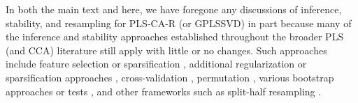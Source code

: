 \documentclass[12pt]{article}
\begin{document}
In both the main text and here, we have foregone any discussions of
inference, stability, and resampling for PLS-CA-R (or GPLSSVD) in part
because many of the inference and stability approaches established
throughout the broader PLS (and CCA) literature still apply with little
or no changes. Such approaches include feature selection or
sparsification \citep{sutton_sparse_2018}, additional regularization or
sparsification approaches
\citep{le_floch_significant_2012-1, guillemot2019constrained, tenenhaus_variable_2014, tenenhaus_regularized_2011},
cross-validation
\citep{wold_principal_1987, rodriguez-perez_overoptimism_2018, kvalheim_number_2019, abdi_partial_2010-1},
permutation \citep{berry_permutation_2011, winkler2020permutation},
various bootstrap approaches
\citep{abdi_partial_2010-1, takane_regularized_2009-1} or tests
\citep{mcintosh_partial_2004, krishnan_partial_2011}, and other
frameworks such as split-half resampling
\citep{strother_quantitative_2002-1, kovacevic2013revisiting, strother2004optimizing}.



\end{document}
